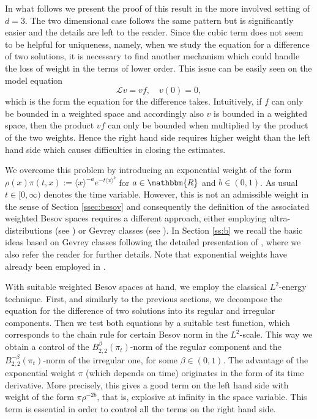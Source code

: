 \documentclass[a4paper,11pt]{article}
\numberwithin{equation}{section}
\newcommand{\LL}{\mathscr{L}}
\newcommand{\8}{\infty}
\begin{document}
In what follows we present the proof of this result in the more involved setting of $d=3$. The two dimensional case follows the same pattern but is significantly easier and  the details are left  to the reader. Since the cubic term does not seem to be helpful for uniqueness, namely, when we study the equation for a difference of two solutions, it is necessary to find another mechanism which could handle the loss of weight in the terms of lower order. This issue can  be easily seen on the model equation
$$
\LL v = v f, \quad v(0)=0,
$$
which is the form the equation for the difference takes. Intuitively, if $f$ can only be bounded in a weighted space and accordingly also $v$ is bounded in a weighted space, then the product $vf$ can only be bounded when multiplied by the product of the two weights. Hence the right hand side requires higher weight than the left hand side which causes difficulties in closing the estimates.

We overcome this problem by introducing an exponential weight of the form $\rho(x)\pi(t,x):=\langle x \rangle^{- a} e^{- t \langle x
\rangle^b}$ for $a \in \mathbbm{R}$ and $b \in (0, 1)$. As usual $t\in [0,\8)$ denotes the time variable. However, this is not an admissible weight in the sense of Section \ref{ssec:besov} and consequently the definition of the associated weighted Besov spaces requires a different approach, either employing ultra-distributions (see \cite{MR891189}) or Gevrey classes (see \cite{MR1249275}). In Section \ref{ss:b} we recall the basic ideas  based on Gevrey classes following the detailed presentation of \cite{MW17}, where we also refer the reader for further
details. Note that exponential weights have already been employed in \cite{MR3358965, MR3779690}.

With suitable weighted Besov spaces at hand, we employ the classical $L^{2}$-energy technique. First, and similarly to the previous sections, we decompose the equation for the difference of two solutions into its regular and irregular components. Then we test both equations by a suitable test function, which corresponds to  the chain rule for certain Besov norm in the $L^{2}$-scale. This way we obtain a control of the $B_{2,2}^{\beta}(\pi_{t})$-norm of the regular component and the $B_{2,2}^{-\beta}(\pi_{t})$-norm of the irregular one, for some $\beta\in (0,1)$. The advantage of the exponential weight $\pi$ (which depends on time) originates in the form of its time derivative. More precisely, this gives a good term on the left hand side with weight of the form $\pi\rho^{-2b}$, that is, explosive at infinity in the space variable. This term is essential in order to control all the terms on the right hand side.
\end{document}
